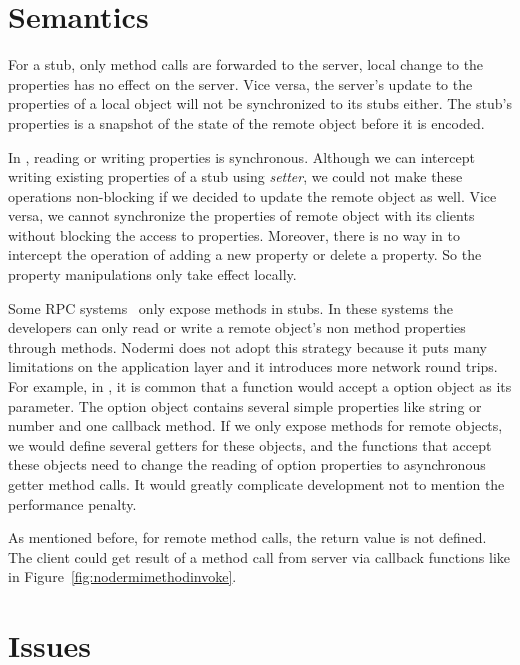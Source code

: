 \section{Semantics}
For a stub, only method calls are forwarded to the server,
local change to the properties has no effect on the server.
Vice versa, the server's update to the properties of a local object will 
not be synchronized to its stubs either.
The stub's properties is a snapshot of the state of 
the remote object before it is encoded.

In \js{}, reading or writing properties is synchronous.
Although we can intercept writing existing properties of a stub using
\emph{setter}, we could not make these operations non-blocking if we decided to update
the remote object as well.
Vice versa, we cannot synchronize the properties of remote object with its clients without
blocking the access to properties.
Moreover, there is no way in \js{} to intercept the operation of adding a new property or delete
a property.
So the property manipulations only take effect locally.

Some RPC systems~\cite{birrell1993distributed} only expose methods in stubs.
In these systems the developers can only read or write a remote object's
non method properties through methods.
Nodermi does not adopt this strategy because it puts many limitations on the
application layer and it introduces more network round trips.
For example, in \js{}, it is common that a function would accept
a option object as its parameter. 
The option object contains several simple properties like string or number 
and one callback method.
If we only expose methods for remote objects, we would define several getters 
for these objects, and the functions that accept these objects 
need to change the reading of option properties to asynchronous getter method calls.
It would greatly complicate development not to mention the performance penalty.


As mentioned before, for remote method calls, the return value is not defined.
The client could get result of a method call
from server via callback functions like in Figure~\ref{fig:nodermimethodinvoke}.




\section{Issues}

